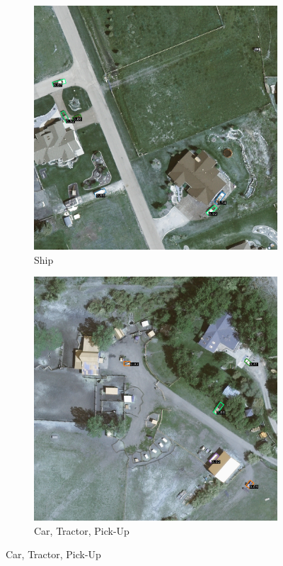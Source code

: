 \begin{figure}[h!]
    \begin{subfigure}[t]{0.38\textwidth}
        \centering
        \includegraphics[width=\linewidth]{images/015Results/02perm_exp/comp_images/rgbndvi/509.png}
        \caption{Ship}
    \end{subfigure}
    \begin{subfigure}[t]{0.38\textwidth}
        \centering
        \includegraphics[width=\linewidth]{images/015Results/02perm_exp/comp_images/rgbndvi/523.png}
        \caption{Car, Tractor, Pick-Up}
    \end{subfigure}
    

\end{figure}
